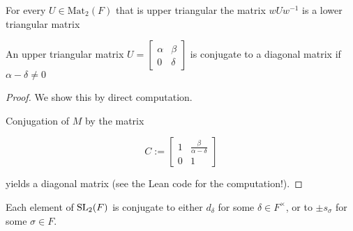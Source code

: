 \begin{remark}
    \label{lower_triangular_isConj_upper_triangular}
    \leanok
    For every $U \in \textrm{Mat}_2(F)$ that is upper triangular the matrix $w U w^{-1}$ is a lower triangular matrix
\end{remark}

\begin{lemma}
    \label{upper_triangular_isConj_diagonal_of_nonzero_det}
    \leanok
    An upper triangular matrix $U = \begin{bmatrix}
        \alpha & \beta\\
        0 & \delta
    \end{bmatrix}$ is conjugate to a diagonal matrix if $\alpha - \delta \ne 0$
\end{lemma}

\begin{proof}
We show this by direct computation.

Conjugation of $M$ by the matrix 

\[
C := \begin{bmatrix}
    1 & \frac{\beta}{\alpha - \delta}\\
    0 & 1
\end{bmatrix}
\]

yields a diagonal matrix (see the Lean code for the computation!).
\end{proof}


\begin{proposition}
\label{SL2_IsConj_d_or_IsConj_s_or_IsConj_neg_s_of_AlgClosed}
\leanok
    Each element of $\operatorname{SL}_2(F)$ is conjugate to either $d_\delta$ for some $\delta \in F^\times$, or to $\pm s_\sigma$ for some $\sigma \in F$.
\end{proposition}

